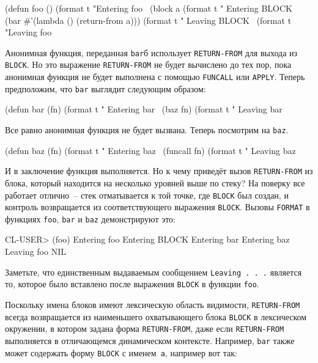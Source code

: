 \begin{myverb}
(defun foo ()
  (format t "Entering foo~%
  (block a
    (format t " Entering BLOCK~%
    (bar #'(lambda () (return-from a)))
    (format t " Leaving BLOCK~%
  (format t "Leaving foo~%
\end{myverb}

Анонимная функция, переданная \lstinline{bar}б использует \lstinline{RETURN-FROM} для выхода из
\lstinline{BLOCK}. Но это выражение \lstinline{RETURN-FROM} не будет вычислено до тех пор, пока
анонимная функция не будет выполнена с помощью \lstinline{FUNCALL} или \lstinline{APPLY}. Теперь
предположим, что \lstinline{bar} выглядит следующим образом:

\begin{myverb}
(defun bar (fn)
  (format t "  Entering bar~%
  (baz fn)
  (format t "  Leaving bar~%
\end{myverb}

Все равно анонимная функция не будет вызвана. Теперь посмотрим на \lstinline{baz}.

\begin{myverb}
(defun baz (fn)
  (format t "   Entering baz~%
  (funcall fn)
  (format t "   Leaving baz~%
\end{myverb}

И в заключение функция выполняется. Но к чему приведёт вызов \lstinline{RETURN-FROM} из блока,
который находится на несколько уровней выше по стеку? На поверку все работает отлично~--
стек отматывается к той точке, где \lstinline{BLOCK} был создан, и контроль возвращается из
соответствующего выражения \lstinline{BLOCK}. Вызовы \lstinline{FORMAT} в функциях \lstinline{foo},
\lstinline{bar} и \lstinline{baz} демонстрируют это:

\begin{myverb}
CL-USER> (foo)
Entering foo
 Entering BLOCK
  Entering bar
   Entering baz
Leaving foo
NIL
\end{myverb}

Заметьте, что единственным выдаваемым сообщением \lstinline{Leaving . . .} является то, которое
было вставлено после выражения \lstinline{BLOCK} в функции \lstinline{foo}.

Поскольку имена блоков имеют лексическую область видимости, \lstinline{RETURN-FROM} всегда
возвращается из наименьшего охватывающего блока \lstinline{BLOCK} в лексическом окружении, в
котором задана форма \lstinline{RETURN-FROM}, даже если \lstinline{RETURN-FROM} выполняется в
отличающемся динамическом контексте. Например, \lstinline{bar} также может содержать форму
\lstinline{BLOCK} с именем~\lstinline{a}, например вот так:

